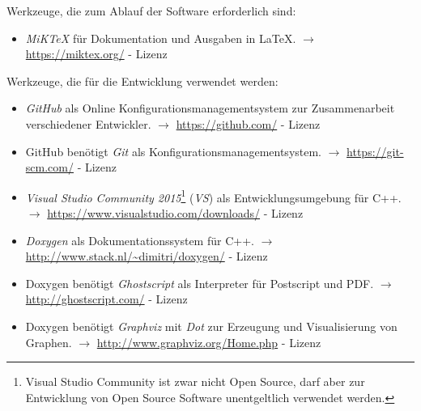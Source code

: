 \documentclass[english,ngerman,parskip=half,headsepline,footsepline]{scrreprt}
\newcounter{Enumi}
\begin{document}
	Werkzeuge, die zum Ablauf der Software erforderlich sind:
	\begin{itemize}
		
		\item\label{Werkzeug:MiKTeX}\emph{MiK\TeX} für Dokumentation und Ausgaben in \LaTeX. $\rightarrow$ \url{https://miktex.org/} - Lizenz \cite{MiKTeX}
		
		\setcounter{Enumi}{\value{enumi}}
	\end{itemize}
	
	Werkzeuge, die für die Entwicklung verwendet werden:
	\begin{itemize}
		\setcounter{enumi}{\value{Enumi}}
		
		\item\label{Werkzeug:GitHub}\emph{GitHub} als Online Konfigurationsmanagementsystem zur Zusammenarbeit verschiedener Entwickler. $\rightarrow$ \url{https://github.com/} - Lizenz \cite{GPLii}
		
		\item\label{Werkzeug:Git}GitHub benötigt \emph{Git} als Konfigurationsmanagementsystem. $\rightarrow$ \url{https://git-scm.com/} - Lizenz \cite{GPLii}
		
		\item\label{Werkzeug:VSC}\emph{Visual Studio Community 2015}\footnote{ Visual Studio Community ist zwar nicht Open Source, darf aber zur Entwicklung von Open Source Software unentgeltlich verwendet werden.} (\emph{VS}) als Entwicklungsumgebung für C++. $\rightarrow$ \url{https://www.visualstudio.com/downloads/} - Lizenz \cite{EULA}
		
		\item\label{Werkzeug:Doxygen}\emph{Doxygen} als Dokumentationssystem für C++. $\rightarrow$ \url{http://www.stack.nl/~dimitri/doxygen/} - Lizenz \cite{GPLii}
		
		\item\label{Werkzeug:Ghostscript}Doxygen benötigt \emph{Ghostscript} als Interpreter für Postscript und PDF. $\rightarrow$ \url{http://ghostscript.com/} - Lizenz \cite{AGPL}
		
		\item\label{Werkzeug:Graphviz}Doxygen benötigt \emph{Graphviz} mit \emph{Dot} zur Erzeugung und Visualisierung von Graphen. $\rightarrow$ \url{http://www.graphviz.org/Home.php} - Lizenz \cite{EPL}
		
		\setcounter{Enumi}{\value{enumi}}
	\end{itemize}
	
\end{document}
